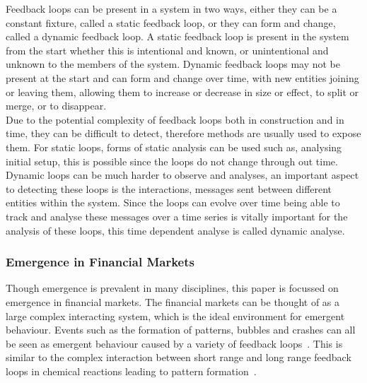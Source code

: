 \documentclass{article}
\begin{document}
Feedback loops can be present in a system in two ways, either they can be a constant fixture, called a static feedback loop, or they can form and change, called a dynamic feedback loop. A static feedback loop is present in the system from the start whether this is intentional and known, or unintentional and unknown to the members of the system. Dynamic feedback loops may not be present at the start and can form and change over time, with new entities joining or leaving them, allowing them to increase or decrease in size or effect, to split or merge, or to disappear.\\
Due to the potential complexity of feedback loops both in construction and in time, they can be difficult to detect, therefore methods are usually used to expose them. For static loops, forms of static analysis can be used such as, analysing initial setup, this is possible since the loops do not change through out time. Dynamic loops can be much harder to observe and analyses, an important aspect to detecting these loops is the interactions, messages sent between different entities within the system. Since the loops can evolve over time being able to track and analyse these messages over a time series is vitally important for the analysis of these loops, this time dependent analyse is called dynamic analyse.  


\subsubsection{Emergence in Financial Markets}
Though emergence is prevalent in many disciplines, this paper is focussed on emergence in financial markets. The financial markets can be thought of as a large complex interacting system, which is the ideal environment for emergent behaviour. Events such as the formation of patterns, bubbles and crashes can all be seen as emergent behaviour caused by a variety of feedback loops~\cite{bubblesandcrashes}. This is similar to the complex interaction between short range and long range feedback loops in chemical reactions leading to pattern formation~\cite{turningchemical}.
\end{document}
